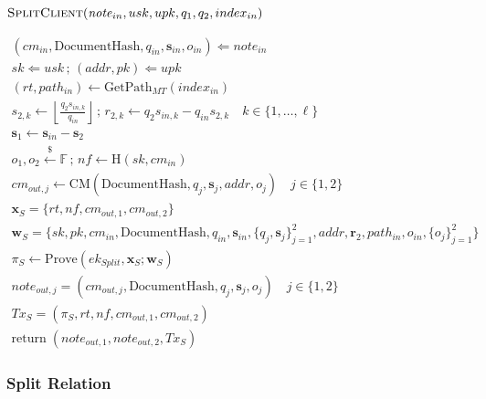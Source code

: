 \documentclass[11pt,a4paper]{extarticle}
\newcommand{\CM}{\mathrm{CM}}
\newcommand{\Hash}{\mathrm{H}}
\newcommand{\Prove}{\mathrm{Prove}}
\newcommand{\sample}{\xleftarrow{\$}}
\newcommand{\DocumentHash}{\mathrm{DocumentHash}}
\newcommand{\Return}{\mathrm{return}\;}
\newenvironment{schemeblock}
{%
  \begingroup
  \setlength{\jot}{8pt}%
  \setlength{\parskip}{0pt}%
  \setlength{\abovedisplayskip}{9pt}%
  \setlength{\belowdisplayskip}{0pt}%
  \setlength{\abovedisplayshortskip}{9pt}%
  \setlength{\belowdisplayshortskip}{0pt}%
  \begin{mdframed}[
    linewidth=0.4pt,
    linecolor=black,
    innerleftmargin=8pt,
    innerrightmargin=8pt,
    innertopmargin=8pt,
    innerbottommargin=8pt,
    skipabove=0pt,
    skipbelow=5pt,
    splittopskip=8pt,
    splitbottomskip=8pt
  ]
  \centering
}
{%
  \end{mdframed}
  \endgroup
}
\begin{document}
\begin{schemeblock}
\(
  \textsc{SplitClient}(
    \mathit{note}_{in},usk,upk,q_1,q_2,index_{in})
\)

\begin{gather*}
(cm_{in},\DocumentHash,q_{in},\mathbf{s}_{in},o_{in})
  \Leftarrow\mathit{note}_{in}
  \\
sk\Leftarrow usk
  \,;\,
  (addr,pk)\Leftarrow upk
  \\
(rt,path_{in})\gets\mathrm{GetPath}_{MT}(index_{in})
  \\
s_{2,k}\gets
\left\lfloor\frac{q_2s_{in,k}}{q_{in}}\right\rfloor
  \,;\,
r_{2,k}\gets q_2s_{in,k}-q_{in}s_{2,k}
  \quad k\in\{1,\ldots,\ell\}
  \\
\mathbf{s}_1\gets\mathbf{s}_{in}-\mathbf{s}_2
  \\
o_1,o_2\sample\mathbb{F}
  \,;\,
  nf\gets\Hash(sk,cm_{in})
  \\
cm_{out,j}
  \gets
  \CM(\DocumentHash,q_j,\mathbf{s}_j,addr,o_j)
  \quad j\in\{1,2\}
  \\
\mathbf{x}_S=\{rt,nf,cm_{out,1},cm_{out,2}\}
  \\
\mathbf{w}_S=\{
    sk,pk,cm_{in},\DocumentHash,q_{in},\mathbf{s}_{in},
    \{q_j,\mathbf{s}_j\}_{j=1}^{2},addr,\mathbf{r}_2,
    path_{in},o_{in},\{o_j\}_{j=1}^{2}\}
  \\
\pi_S\gets
  \Prove(ek_{Split},\mathbf{x}_S;\mathbf{w}_S)
  \\
\mathit{note}_{out,j}=(cm_{out,j},\DocumentHash,q_j,\mathbf{s}_j,o_j)
  \quad j\in\{1,2\}
  \\
\mathit{Tx}_S=(\pi_S,rt,nf,cm_{out,1},cm_{out,2})
  \\
\Return(\mathit{note}_{out,1},\mathit{note}_{out,2},\mathit{Tx}_S)
\end{gather*}
\end{schemeblock}

\subsubsection{Split Relation}
\end{document}
